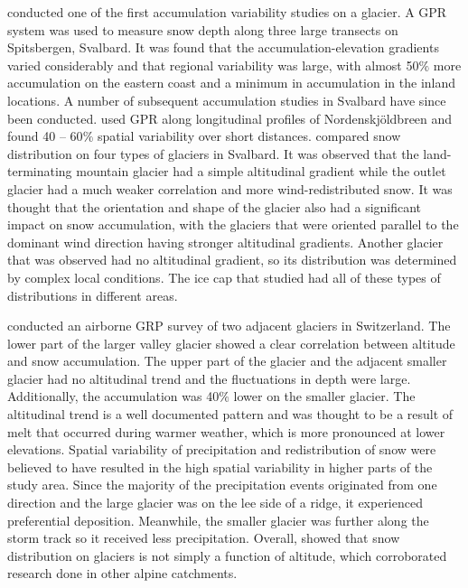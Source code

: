 \documentclass{sfuthesis}
\begin{document}
\cite{Winther1998} conducted one of the first accumulation variability studies on a glacier. A GPR system was used to measure snow depth along three large transects on Spitsbergen, Svalbard. It was found that the accumulation-elevation gradients varied considerably and that regional variability was large, with almost 50$\%$ more accumulation on the eastern coast and a minimum in accumulation in the inland locations. A number of subsequent accumulation studies in Svalbard have since been conducted. \cite{Palli2002} used GPR along longitudinal profiles of Nordenskj\"{o}ldbreen and found 40 -- 60$\%$ spatial variability over short distances. \cite{Grabiec2011} compared snow distribution on four types of glaciers in Svalbard. It was observed that the land-terminating mountain glacier had a simple altitudinal gradient while the outlet glacier had a much weaker correlation and more wind-redistributed snow. It was thought that the orientation and shape of the glacier also had a significant impact on snow accumulation, with the glaciers that were oriented parallel to the dominant wind direction having stronger altitudinal gradients. Another glacier that was observed had no altitudinal gradient, so its distribution was determined by complex local conditions. The ice cap that \cite{Grabiec2011} studied had all of these types of distributions in different areas.

\cite{Machguth2006} conducted an airborne GRP survey of two adjacent glaciers in Switzerland. The lower part of the larger valley glacier showed a clear correlation between altitude and snow accumulation. The upper part of the glacier and the adjacent smaller glacier had no altitudinal trend and the fluctuations in depth were large. Additionally, the accumulation was 40$\%$ lower on the smaller glacier. The altitudinal trend is a well documented pattern and was thought to be a result of melt that occurred during warmer weather, which is more pronounced at lower elevations. Spatial variability of precipitation and redistribution of snow were believed to have resulted in the high spatial variability in higher parts of the study area. Since the majority of the precipitation events originated from one direction and the large glacier was on the lee side of a ridge, it experienced preferential deposition. Meanwhile, the smaller glacier was further along the storm track so it received less precipitation. Overall, \cite{Machguth2006} showed that snow distribution on glaciers is not simply a function of altitude, which corroborated research done in other alpine catchments.
\end{document}
